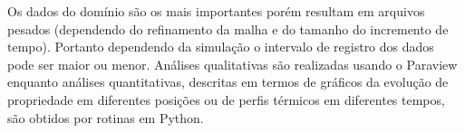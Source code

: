     Os dados do domínio são os mais importantes porém resultam em arquivos
    pesados (dependendo do refinamento da malha e do tamanho do incremento de
    tempo). Portanto dependendo da simulação o intervalo de registro dos dados
    pode ser maior ou menor. Análises qualitativas são realizadas usando o
    Paraview enquanto análises quantitativas, descritas em termos de gráficos da
    evolução de propriedade em diferentes posições ou de perfis térmicos em
    diferentes tempos, são obtidos por rotinas em Python.



